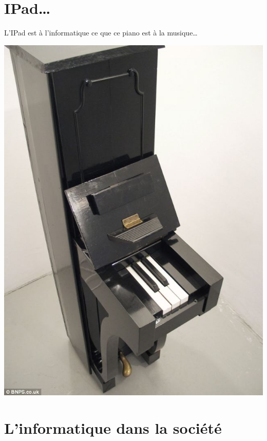 \documentclass[french]{beamer}
\begin{document}
\section{IPad\ldots{}}

\begin{frame}
L'IPad est à l'informatique ce que ce piano est à la musique\ldots{}
 \begin{center}
\includegraphics[height=.8\textheight]{./IpadPiano2touches.jpg}
\end{center}
\end{frame}





\section{L'informatique dans la société}
\end{document}
